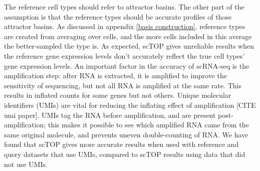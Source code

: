\documentclass[aps,superscriptaddress, notitlepage,longbibliography]{revtex4-1}
\begin{document}
The reference cell types should refer to attractor basins. The other part of the assumption is that the reference types should be accurate profiles of those attractor basins. As discussed in appendix \ref{basis construction}, reference types are created from averaging over cells, and the more cells included in this average the better-sampled the type is. As expected, scTOP gives unreliable results when the reference gene expression levels don't accurately reflect the true cell types' gene expression levels. An important factor in the accuracy of scRNA-seq is the amplification step: after RNA is extracted, it is amplified to improve the sensitivity of sequencing, but not all RNA is amplified at the same rate. This results in inflated counts for some genes but not others. Unique molecular identifiers (UMIs) are vital for reducing the inflating effect of amplification [CITE umi paper]. UMIs tag the RNA before amplification, and are present post-amplification; this makes it possible to see which amplified RNA came from the same original molecule, and prevents uneven double-counting of RNA. We have found that scTOP gives more accurate results when used with reference and query datasets that use UMIs, compared to scTOP results using data that did not use UMIs.
\end{document}
